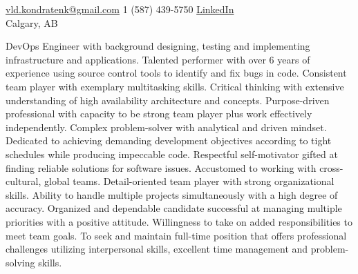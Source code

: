 \documentclass[10pt,a4paper]{article} %
\begin{document}
 



\noindent\href{mailto:vld.kondratenk@gmail.com}{vld.kondratenk@gmail.com}\bull %
\textsmaller{+}1 (587) 439-5750\bull  %
\href{https://www.linkedin.com/in/bakbukdibbuk/}{LinkedIn}\\ %
Calgary, AB\bull 

\spacedhrule{0.9em}{-0.4em} %



\vspace{-1.3em} %

\begin{multicols}{2}  %
DevOps Engineer with background designing, testing and implementing infrastructure and applications. Talented performer with over 6 years of experience using source control tools to identify and fix bugs in code. Consistent team player with exemplary multitasking skills. Critical thinking with extensive understanding of high availability architecture and concepts. Purpose-driven professional with capacity to be strong team player plus work effectively independently. Complex problem-solver with analytical and driven mindset. Dedicated to achieving demanding development objectives according to tight schedules while producing impeccable code. Respectful self-motivator gifted at finding reliable solutions for software issues. Accustomed to working with cross-cultural, global teams. Detail-oriented team player with strong organizational skills. Ability to handle multiple projects simultaneously with a high degree of accuracy. Organized and dependable candidate successful at managing multiple priorities with a positive attitude. Willingness to take on added responsibilities to meet team goals. To seek and maintain full-time position that offers professional challenges utilizing interpersonal skills, excellent time management and problem-solving skills.
\end{multicols}
\end{document}
